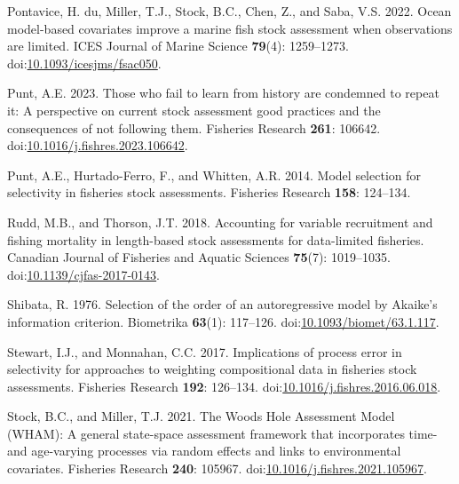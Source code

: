 \documentclass[
  12pt,
]{article}
\newlength{\cslhangindent}
\newlength{\cslentryspacingunit} %
\newenvironment{CSLReferences}[2] %
 {%
  \setlength{\parindent}{0pt}
  \ifodd #1
  \let\oldpar\par
  \def\par{\hangindent=\cslhangindent\oldpar}
  \fi
  \setlength{\parskip}{#2\cslentryspacingunit}
 }%
 {}
\begin{document}
\begin{CSLReferences}{1}{0}
\leavevmode{}%
Pontavice, H. du, Miller, T.J., Stock, B.C., Chen, Z., and Saba, V.S.
2022. Ocean model-based covariates improve a marine fish stock
assessment when observations are limited. ICES Journal of Marine Science
\textbf{79}(4): 1259--1273.
doi:\href{https://doi.org/10.1093/icesjms/fsac050}{10.1093/icesjms/fsac050}.

\leavevmode{}%
Punt, A.E. 2023. Those who fail to learn from history are condemned to
repeat it: A perspective on current stock assessment good practices and
the consequences of not following them. Fisheries Research \textbf{261}:
106642.
doi:\href{https://doi.org/10.1016/j.fishres.2023.106642}{10.1016/j.fishres.2023.106642}.

\leavevmode{}%
Punt, A.E., Hurtado-Ferro, F., and Whitten, A.R. 2014. Model selection
for selectivity in fisheries stock assessments. Fisheries Research
\textbf{158}: 124--134.

\leavevmode{}%
Rudd, M.B., and Thorson, J.T. 2018. Accounting for variable recruitment
and fishing mortality in length-based stock assessments for data-limited
fisheries. Canadian Journal of Fisheries and Aquatic Sciences
\textbf{75}(7): 1019--1035.
doi:\href{https://doi.org/10.1139/cjfas-2017-0143}{10.1139/cjfas-2017-0143}.

\leavevmode{}%
Shibata, R. 1976. Selection of the order of an autoregressive model by
{A}kaike's information criterion. Biometrika \textbf{63}(1): 117--126.
doi:\href{https://doi.org/10.1093/biomet/63.1.117}{10.1093/biomet/63.1.117}.

\leavevmode{}%
Stewart, I.J., and Monnahan, C.C. 2017. Implications of process error in
selectivity for approaches to weighting compositional data in fisheries
stock assessments. Fisheries Research \textbf{192}: 126--134.
doi:\href{https://doi.org/10.1016/j.fishres.2016.06.018}{10.1016/j.fishres.2016.06.018}.

\leavevmode{}%
Stock, B.C., and Miller, T.J. 2021. The {W}oods {H}ole {A}ssessment
{M}odel ({WHAM}): {A} general state-space assessment framework that
incorporates time- and age-varying processes via random effects and
links to environmental covariates. Fisheries Research \textbf{240}:
105967.
doi:\href{https://doi.org/10.1016/j.fishres.2021.105967}{10.1016/j.fishres.2021.105967}.


\end{CSLReferences}
\end{document}

